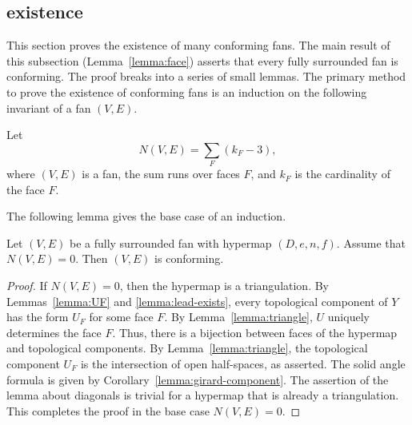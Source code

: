 \subsection{existence}




This section proves the existence of many conforming fans.  The main result
of this subsection
(Lemma~\ref{lemma:face}) asserts that every fully surrounded fan is conforming.  The
proof breaks into a series of small lemmas.  The primary
method to prove the existence of conforming fans is an induction on
the following invariant of a fan $(V,E)$.

\begin{definition}[$N(V,E)$]
Let
\begin{displaymath}
N(V,E) = \sum_F (k_F - 3),
\end{displaymath}
where $(V,E)$ is a fan, the sum runs over faces $F$, and $k_F$ is the
cardinality of the face $F$.
\end{definition}

The following lemma gives the base case of an induction.

\begin{lemma}[]\label{lemma:N=0}
Let $(V,E)$ be a fully surrounded fan with hypermap $(D,e,n,f)$. 
Assume that $N(V,E)=0$.
Then $(V,E)$ is conforming.
\end{lemma}
%
%
%

\begin{proof}
If $N(V,E)=0$, then the hypermap is a triangulation.  By
Lemmas~\ref{lemma:UF} and \ref{lemma:lead-exists}, every topological
component of $Y$ has the form $U_F$ for some face $F$.  By
Lemma~\ref{lemma:triangle}, $U$ uniquely determines the face $F$.
Thus, there is a bijection between faces of the hypermap and
topological components.  By Lemma~\ref{lemma:triangle}, the
topological component $U_F$ is the intersection of open half-spaces,
as asserted.  The solid angle formula is given by
Corollary~\ref{lemma:girard-component}.  The assertion of the lemma
about diagonals
is trivial for a hypermap that is already a triangulation. This
completes the proof in the base case $N(V,E)=0$.
\end{proof}


